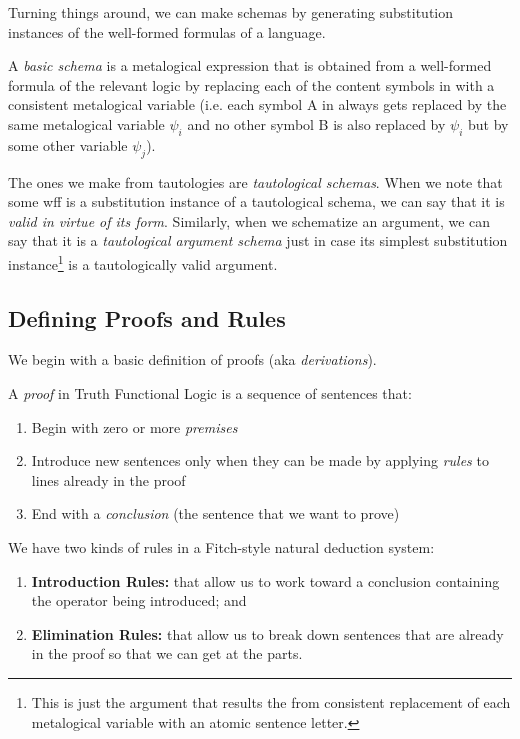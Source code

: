 Turning things around, we can make schemas by generating substitution instances
of the well-formed formulas of a language.

\begin{definition}
  A \emph{basic schema} \schi is a metalogical expression that is obtained from
  a well-formed formula \sphi of the relevant logic by replacing each of the
  content symbols in \sphi with a consistent metalogical variable (i.e. each
  symbol A in \sphi always gets replaced by the same metalogical variable
  $\psi_i$ and no other symbol B is also replaced by $\psi_i$ but by some other
  variable $\psi_j$).
\end{definition}

The ones we make from tautologies are \emph{tautological schemas}. When we note
that some wff is a substitution instance of a tautological schema, we can say
that it is \emph{valid in virtue of its form}. Similarly, when we schematize an
argument, we can say that it is a \emph{tautological argument schema} just in
case its simplest substitution instance\footnote{This is just the argument that
results the from consistent replacement of each metalogical variable with an
atomic sentence letter.} is a tautologically valid argument.

\subsection{Defining Proofs and Rules}

We begin with a basic definition of proofs (aka \emph{derivations}).

\begin{definition}[Proof]
  \label{def:formal-proof}
  A \emph{proof} in Truth Functional Logic is a sequence of sentences that:
  \begin{enumerate}
  \item Begin with zero or more \emph{premises}
  \item Introduce new sentences only when they can be made by applying
    \emph{rules} to lines already in the proof
  \item End with a \emph{conclusion} (the sentence that we want to prove)
  \end{enumerate}  
\end{definition}

We have two kinds of rules in a Fitch-style natural deduction system:
\begin{enumerate}
\item \textbf{Introduction Rules:} that allow us to work toward a conclusion
  containing the operator being introduced; and
\item \textbf{Elimination Rules:} that allow us to break down sentences that
  are already in the proof so that we can get at the parts.
\end{enumerate}  

